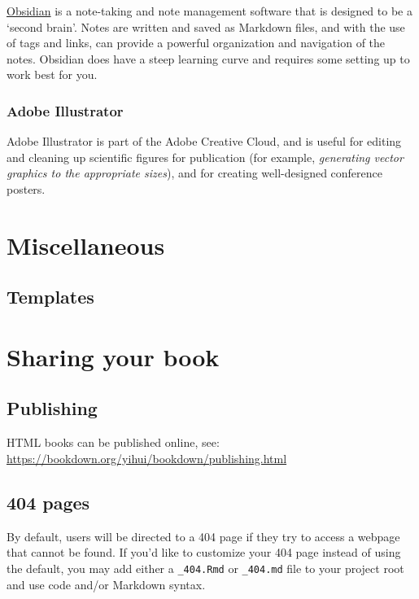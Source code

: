 \documentclass[
]{book}
\begin{document}
\href{https://obsidian.md/}{Obsidian} is a note-taking and note management software that is designed to be a `second brain'. Notes are written and saved as Markdown files, and with the use of tags and links, can provide a powerful organization and navigation of the notes. Obsidian does have a steep learning curve and requires some setting up to work best for you.

\hypertarget{adobe-illustrator}{%
\subsection*{Adobe Illustrator}\label{adobe-illustrator}}

Adobe Illustrator is part of the Adobe Creative Cloud, and is useful for editing and cleaning up scientific figures for publication (for example, \emph{generating vector graphics to the appropriate sizes}), and for creating well-designed conference posters.

\hypertarget{miscellaneous}{%
\chapter{Miscellaneous}\label{miscellaneous}}

\hypertarget{templates}{%
\section{Templates}\label{templates}}

\hypertarget{sharing-your-book}{%
\chapter{Sharing your book}\label{sharing-your-book}}

\hypertarget{publishing}{%
\section{Publishing}\label{publishing}}

HTML books can be published online, see: \url{https://bookdown.org/yihui/bookdown/publishing.html}

\hypertarget{pages}{%
\section{404 pages}\label{pages}}

By default, users will be directed to a 404 page if they try to access a webpage that cannot be found. If you'd like to customize your 404 page instead of using the default, you may add either a \texttt{\_404.Rmd} or \texttt{\_404.md} file to your project root and use code and/or Markdown syntax.
\end{document}
